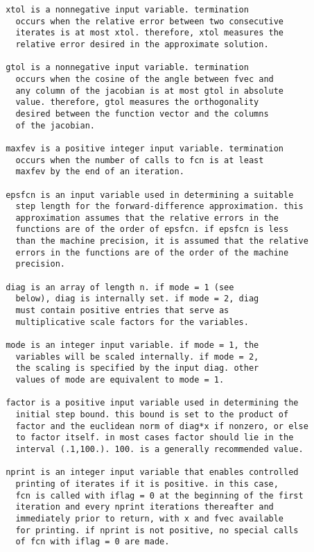 \begin{verbatim}
       xtol is a nonnegative input variable. termination
         occurs when the relative error between two consecutive
         iterates is at most xtol. therefore, xtol measures the
         relative error desired in the approximate solution.

       gtol is a nonnegative input variable. termination
         occurs when the cosine of the angle between fvec and
         any column of the jacobian is at most gtol in absolute
         value. therefore, gtol measures the orthogonality
         desired between the function vector and the columns
         of the jacobian.

       maxfev is a positive integer input variable. termination
         occurs when the number of calls to fcn is at least
         maxfev by the end of an iteration.

       epsfcn is an input variable used in determining a suitable
         step length for the forward-difference approximation. this
         approximation assumes that the relative errors in the
         functions are of the order of epsfcn. if epsfcn is less
         than the machine precision, it is assumed that the relative
         errors in the functions are of the order of the machine
         precision.

       diag is an array of length n. if mode = 1 (see
         below), diag is internally set. if mode = 2, diag
         must contain positive entries that serve as
         multiplicative scale factors for the variables.

       mode is an integer input variable. if mode = 1, the
         variables will be scaled internally. if mode = 2,
         the scaling is specified by the input diag. other
         values of mode are equivalent to mode = 1.

       factor is a positive input variable used in determining the
         initial step bound. this bound is set to the product of
         factor and the euclidean norm of diag*x if nonzero, or else
         to factor itself. in most cases factor should lie in the
         interval (.1,100.). 100. is a generally recommended value.

       nprint is an integer input variable that enables controlled
         printing of iterates if it is positive. in this case,
         fcn is called with iflag = 0 at the beginning of the first
         iteration and every nprint iterations thereafter and
         immediately prior to return, with x and fvec available
         for printing. if nprint is not positive, no special calls
         of fcn with iflag = 0 are made.


\end{verbatim}
